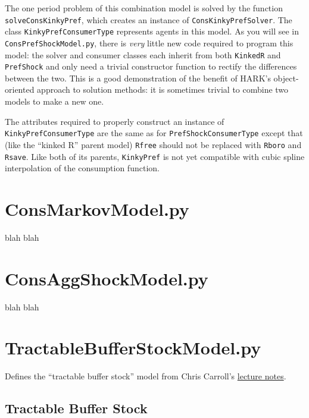 \documentclass[12pt,titlepage,letterpaper]{econtex}
\begin{document}
The one period problem of this combination model is solved by the function \texttt{solveConsKinkyPref}, which creates an instance of \texttt{ConsKinkyPrefSolver}.  The class \texttt{KinkyPrefConsumerType} represents agents in this model.  As you will see in \texttt{ConsPrefShockModel.py}, there is \textit{very} little new code required to program this model: the solver and consumer classes each inherit from both \texttt{KinkedR} and \texttt{PrefShock} and only need a trivial constructor function to rectify the differences between the two.  This is a good demonstration of the benefit of HARK's object-oriented approach to solution methods: it is sometimes trivial to combine two models to make a new one.

The attributes required to properly construct an instance of \texttt{KinkyPrefConsumerType} are the same as for \texttt{PrefShockConsumerType} except that (like the ``kinked R'' parent model) \texttt{Rfree} should not be replaced with \texttt{Rboro} and \texttt{Rsave}.  Like both of its parents, \texttt{KinkyPref} is not yet compatible with cubic spline interpolation of the consumption function.

\newpage

\section{ConsMarkovModel.py}

blah blah

\newpage \section{ConsAggShockModel.py}

blah blah

\newpage

\section{TractableBufferStockModel.py}

Defines the ``tractable buffer stock'' model from Chris Carroll's \href{http://www.econ2.jhu.edu/people/ccarroll/public/LectureNotes/Consumption/TractableBufferStock.pdf}{lecture notes}.

\subsection{Tractable Buffer Stock}
\end{document}
